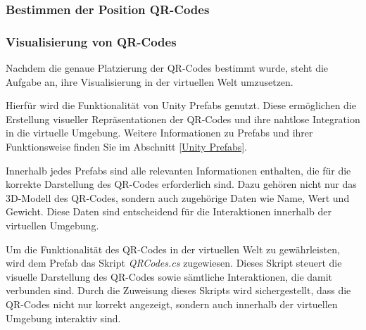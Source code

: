 \subsubsection{Bestimmen der Position QR-Codes}

\subsubsection{Visualisierung von QR-Codes}
Nachdem die genaue Platzierung der QR-Codes bestimmt wurde, steht die Aufgabe an, ihre Visualisierung in der virtuellen Welt umzusetzen.

Hierfür wird die Funktionalität von Unity Prefabs genutzt. Diese ermöglichen die Erstellung visueller Repräsentationen
der QR-Codes und ihre nahtlose Integration in die virtuelle Umgebung. Weitere Informationen zu Prefabs und ihrer Funktionsweise
finden Sie im Abschnitt \ref{Unity Prefabs}.

Innerhalb jedes Prefabs sind alle relevanten Informationen enthalten, die für die korrekte Darstellung des QR-Codes
erforderlich sind. Dazu gehören nicht nur das 3D-Modell des QR-Codes, sondern auch zugehörige Daten wie Name, Wert und
Gewicht. Diese Daten sind entscheidend für die Interaktionen innerhalb der virtuellen Umgebung.

Um die Funktionalität des QR-Codes in der virtuellen Welt zu gewährleisten, wird dem Prefab das Skript \textit{QRCodes.cs} zugewiesen.
Dieses Skript steuert die visuelle Darstellung des QR-Codes sowie sämtliche Interaktionen, die damit verbunden sind. Durch
die Zuweisung dieses Skripts wird sichergestellt, dass die QR-Codes nicht nur korrekt angezeigt, sondern auch innerhalb
der virtuellen Umgebung interaktiv sind.

